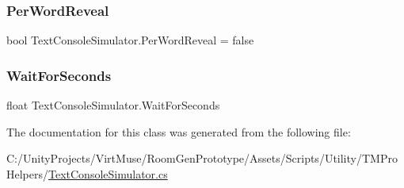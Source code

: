 \mbox{\label{class_text_console_simulator_a9987d72c0306d133dd93df659ba654bf}} 
\subsubsection{\texorpdfstring{Per\+Word\+Reveal}{PerWordReveal}}
{\footnotesize\ttfamily bool Text\+Console\+Simulator.\+Per\+Word\+Reveal = false\hspace{0.3cm}{\ttfamily [private]}}

\mbox{\label{class_text_console_simulator_ac13624a34ec39672645dbf9a090e8e4d}} 
\subsubsection{\texorpdfstring{Wait\+For\+Seconds}{WaitForSeconds}}
{\footnotesize\ttfamily float Text\+Console\+Simulator.\+Wait\+For\+Seconds\hspace{0.3cm}{\ttfamily [private]}}



The documentation for this class was generated from the following file\+:\begin{DoxyCompactItemize}
\item 
C\+:/\+Unity\+Projects/\+Virt\+Muse/\+Room\+Gen\+Prototype/\+Assets/\+Scripts/\+Utility/\+T\+M\+Pro\+Helpers/\mbox{\hyperlink{_text_console_simulator_8cs}{Text\+Console\+Simulator.\+cs}}\end{DoxyCompactItemize}

